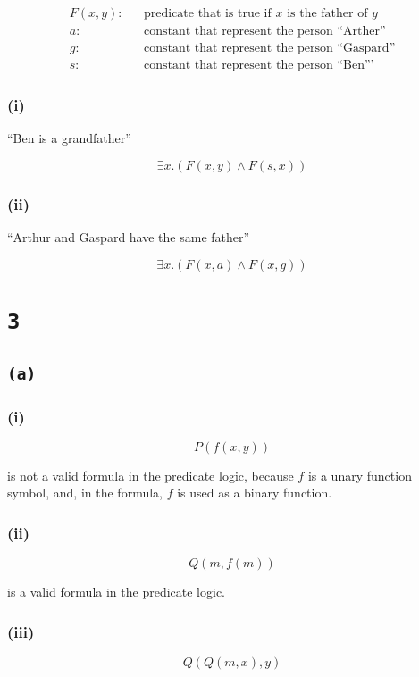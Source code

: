 \documentclass[a4paper,11pt]{report}
\begin{document}
\begin{align*}
  F(x,y) : && \text{predicate that is true if $x$ is the father of $y$} \\
  a : && \text{constant that represent the person ``Arther''} \\
  g : && \text{constant that represent the person ``Gaspard''} \\
  s : && \text{constant that represent the person ``Ben'''}
\end{align*}

\subsubsection*{(i)}

``Ben is a grandfather''

\[
  \exists x.(F(x,y) \wedge F(s,x))
\]

\subsubsection*{(ii)}

``Arthur and Gaspard have the same father''

\[
  \exists x.(F(x,a) \wedge F(x,g))
\]

\section*{\texttt{3}}

\subsection*{\texttt{(a)}}

\subsubsection*{(i)}
\[
  P(f(x,y))
\]

is not a valid formula in the predicate logic, because $f$ is a unary function
symbol, and, in the formula, $f$ is used as a binary function.

\subsubsection*{(ii)}
\[
  Q(m,f(m))
\]

is a valid formula in the predicate logic.

\subsubsection*{(iii)}
\[
  Q(Q(m,x),y)
\]
\end{document}
